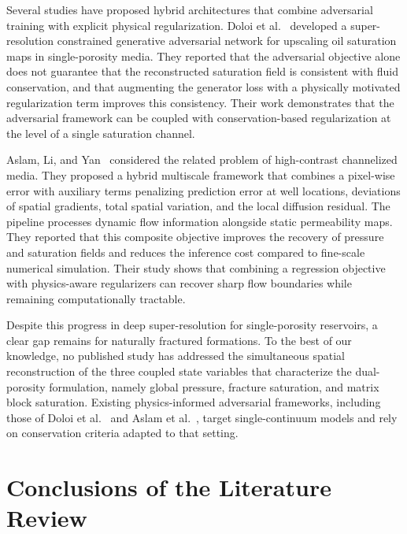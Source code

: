 Several studies have proposed hybrid architectures that combine adversarial training with explicit physical regularization. Doloi et al.~\cite{arxiv_doloi_srcsgan} developed a super-resolution constrained generative adversarial network for upscaling oil saturation maps in single-porosity media. They reported that the adversarial objective alone does not guarantee that the reconstructed saturation field is consistent with fluid conservation, and that augmenting the generator loss with a physically motivated regularization term improves this consistency. Their work demonstrates that the adversarial framework can be coupled with conservation-based regularization at the level of a single saturation channel.

Aslam, Li, and Yan~\cite{li2025spe} considered the related problem of high-contrast channelized media. They proposed a hybrid multiscale framework that combines a pixel-wise error with auxiliary terms penalizing prediction error at well locations, deviations of spatial gradients, total spatial variation, and the local diffusion residual. The pipeline processes dynamic flow information alongside static permeability maps. They reported that this composite objective improves the recovery of pressure and saturation fields and reduces the inference cost compared to fine-scale numerical simulation. Their study shows that combining a regression objective with physics-aware regularizers can recover sharp flow boundaries while remaining computationally tractable.

Despite this progress in deep super-resolution for single-porosity reservoirs, a clear gap remains for naturally fractured formations. To the best of our knowledge, no published study has addressed the simultaneous spatial reconstruction of the three coupled state variables that characterize the dual-porosity formulation, namely global pressure, fracture saturation, and matrix block saturation. Existing physics-informed adversarial frameworks, including those of Doloi et al.~\cite{arxiv_doloi_srcsgan} and Aslam et al.~\cite{li2025spe}, target single-continuum models and rely on conservation criteria adapted to that setting.


\section{Conclusions of the Literature Review}
\label{sec:lr_summary}

